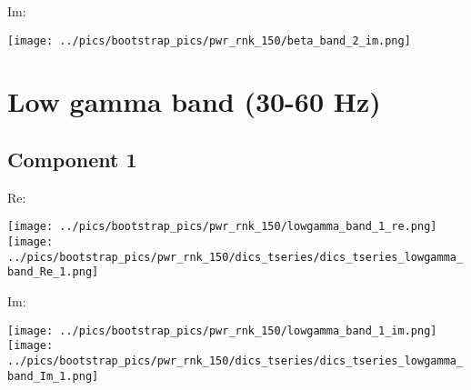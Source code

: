 \documentclass{article}
\begin{document}
Im:

\hspace{2cm}
\texttt{[image: ../pics/bootstrap\_pics/pwr\_rnk\_150/beta\_band\_2\_im.png]}



\section{Low gamma band (30-60 Hz)}
\subsection*{Component 1}
Re:


\hspace{2cm}
\texttt{[image: ../pics/bootstrap\_pics/pwr\_rnk\_150/lowgamma\_band\_1\_re.png]}
\hspace{2cm}
\texttt{[image: ../pics/bootstrap\_pics/pwr\_rnk\_150/dics\_tseries/dics\_tseries\_lowgamma\_band\_Re\_1.png]}

Im:

\hspace{2cm}
\texttt{[image: ../pics/bootstrap\_pics/pwr\_rnk\_150/lowgamma\_band\_1\_im.png]}
\hspace{2cm}
\texttt{[image: ../pics/bootstrap\_pics/pwr\_rnk\_150/dics\_tseries/dics\_tseries\_lowgamma\_band\_Im\_1.png]}
\end{document}
